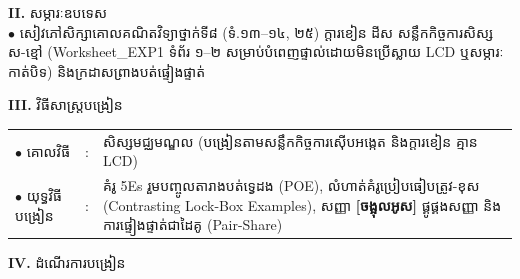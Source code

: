 \documentclass[a4paper,10pt]{article}
\newcommand{\en}[1]{{\TimesEn #1}}
\begin{document}
{\vspace{2pt}

\textbf{II.} {\muol សម្ភារៈឧបទេស}\\[1pt]
\hspace*{0.55cm}$\bullet$ \hspace{0.35cm} សៀវភៅសិក្សាគោលគណិតវិទ្យាថ្នាក់ទី៨ (ទំ.១៣–១៤, ២៥) ក្ដារខៀន ដីស សន្លឹកកិច្ចការសិស្ស ស-ខ្មៅ (\en{Worksheet\_EXP1} ទំព័រ ១–២ សម្រាប់បំពេញផ្ទាល់ដោយមិនប្រើស្លាយ \en{LCD} ឬសម្ភារៈកាត់បិទ) និងក្រដាសព្រាងបត់ផ្ទៀងផ្ទាត់

\vspace{2pt}

\textbf{III.} {\muol វិធីសាស្រ្តបង្រៀន}\\[1pt]
\hspace*{0.45cm}%
\begin{tabular}{@{}l l L{14.85cm}@{}}
  $\bullet$ \hspace{0.25cm} គោលវិធី & : & សិស្សមជ្ឈមណ្ឌល (បង្រៀនតាមសន្លឹកកិច្ចការស៊ើបអង្កេត និងក្ដារខៀន គ្មាន \en{LCD}) \\
  $\bullet$ \hspace{0.25cm} យុទ្ធវិធីបង្រៀន & : & គំរូ \en{5Es} រួមបញ្ចូលតារាងបត់ទ្វេដង (\en{POE}), លំហាត់គំរូប្រៀបធៀបត្រូវ-ខុស (\en{Contrasting Lock-Box Examples}), សញ្ញា \textbf{[ចង្អុលអូស]} ផ្គូផ្គងសញ្ញា និងការផ្ទៀងផ្ទាត់ជាដៃគូ (\en{Pair-Share}) \\
\end{tabular}
}

\vspace{2pt}

\textbf{IV.} {\muol ដំណើរការបង្រៀន}

\vspace{1pt}
\end{document}
